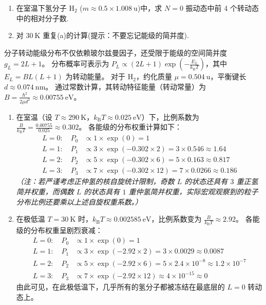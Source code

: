 \begin{exercise}\label{ex:26.8}
\begin{enumerate}
  \item[(a)] 在室温下氢分子 $\mathrm{H}_2$ ($m \approx 0.5 \times 1.008 \ \mathrm{u}$)中，求 $N=0$ 振动态中前 4 个转动态中的相对分子数. 
  \item[(b)] 对 $30 \ \mathrm{K}$ 重复(a)的计算(提示：不要忘记能级的简并度).
\end{enumerate}
\end{exercise}
\begin{solution}
分子转动能级分布不仅依赖玻尔兹曼因子，还受限于能级的空间简并度 $g_L = 2L+1$。
分布概率可表示为 $P_L \propto (2L+1) \exp\left( - \frac{E_L}{k_{\mathrm{B}} T} \right)$，其中 $E_L = B L(L+1)$ 为转动能量。
对于 $\mathrm{H}_2$，约化质量 $\mu = 0.504 \ \mathrm{u}$，平衡键长 $d \approx 0.074 \ \mathrm{nm}$。
通过常数计算，其转动特征能量（转动常量）为 $B = \frac{\hbar^2}{2\mu d^2} \approx 0.00755 \ \mathrm{eV}$。

\begin{enumerate}
    \item[(a)] 在室温（设 $T \approx 290 \ \mathrm{K}$，$k_{\mathrm{B}} T \approx 0.025 \ \mathrm{eV}$）下，比例系数为 $\frac{B}{k_{\mathrm{B}} T} = \frac{0.00755}{0.025} \approx 0.302$。
    各能级的分布权重计算如下：
    \begin{align*}
        L=0: \quad P_0 &\propto 1 \times \exp(0) = 1 \\
        L=1: \quad P_1 &\propto 3 \times \exp(-0.302 \times 2) = 3 \times 0.546 \approx 1.64 \\
        L=2: \quad P_2 &\propto 5 \times \exp(-0.302 \times 6) = 5 \times 0.163 \approx 0.817 \\
        L=3: \quad P_3 &\propto 7 \times \exp(-0.302 \times 12) = 7 \times 0.0266 \approx 0.186
    \end{align*}
    \textit{（注：若严谨考虑正仲氢的核自旋统计限制，奇数 $L$ 的状态还具有 $3$ 重正氢简并权重，而偶数 $L$ 的状态具有 $1$ 重仲氢简并权重，实际宏观观察到的粒子分布比例还要乘以上述自旋权重系数。）}

    \item[(b)] 在极低温 $T = 30 \ \mathrm{K}$ 时，$k_{\mathrm{B}} T \approx 0.002585 \ \mathrm{eV}$，比例系数变为 $\frac{B}{k_{\mathrm{B}} T} \approx 2.92$。
    各能级的分布权重呈剧烈衰减：
    \begin{align*}
        L=0: \quad P_0 &\propto 1 \times \exp(0) = 1 \\
        L=1: \quad P_1 &\propto 3 \times \exp(-2.92 \times 2) = 3 \times 0.0029 \approx 0.0087 \\
        L=2: \quad P_2 &\propto 5 \times \exp(-2.92 \times 6) = 5 \times 2.4 \times 10^{-8} \approx 1.2 \times 10^{-7} \\
        L=3: \quad P_3 &\propto 7 \times \exp(-2.92 \times 12) \approx 4 \times 10^{-15} \approx 0
    \end{align*}
    由此可见，在此极低温下，几乎所有的氢分子都被冻结在最底层的 $L=0$ 转动态上。
\end{enumerate}
\end{solution}

